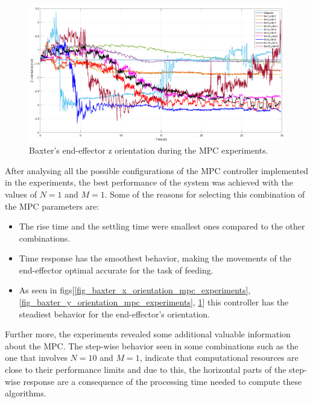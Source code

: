 \documentclass[11pt]{report} %
\begin{document}
\begin{figure}[H]
    \centering
    \includegraphics[width=1.0\linewidth]{assets/imgs/control_theory/mpc_tests/z_orientation.png}
    \caption{Baxter's end-effector z orientation during the MPC experiments.} 
    \label{fig_baxter_z_orientation_mpc_experiments}
\end{figure}


After analysing all the possible configurations of the MPC controller implemented in the experiments, the best performance of the system was achieved with the values of $N = 1$ and $M = 1$. Some of the reasons for selecting this combination of the MPC parameters are:

\begin{itemize}
    \item The rise time and the settling time were smallest ones compared to the other combinations.
    \item Time response has the smoothest behavior, making the movements of the end-effector optimal accurate for the task of feeding.
    \item As seen in figs[\ref{fig_baxter_x_orientation_mpc_experiments}, \ref{fig_baxter_y_orientation_mpc_experiments}, \ref{fig_baxter_z_orientation_mpc_experiments}] this controller has the steadiest behavior for the end-effector's orientation.
\end{itemize}

Further more, the experiments revealed some additional valuable information about the MPC. The step-wise behavior seen in some combinations such as the one that involves $N = 10$ and $M = 1$, indicate that computational resources are close to their performance limits and due to this, the horizontal parts of the step-wise response are a consequence of the processing time needed to compute these algorithms. \\
\end{document}
